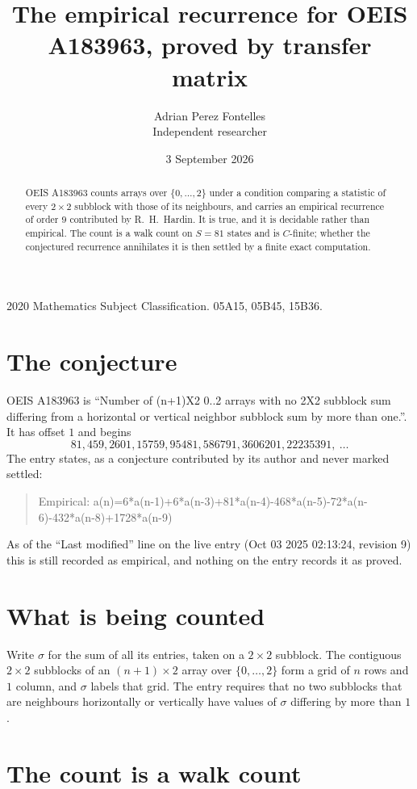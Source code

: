 \documentclass[11pt,a4paper]{article}
\title{The empirical recurrence for OEIS A183963, proved by transfer matrix}
\author{Adrian Perez Fontelles\\ \small Independent researcher}
\date{3 September 2026}
\theoremstyle{plain}
\theoremstyle{definition}
\begin{document}
\maketitle

\begin{abstract}
OEIS A183963 counts arrays over $\{0,\dots,2\}$ under a condition comparing a statistic of
every $2\times2$ subblock with those of its neighbours, and carries an empirical recurrence
of order $9$ contributed by R.~H.~Hardin. It is true, and it is decidable rather than
empirical. The count is a walk count on $S=81$ states and is $C$-finite; whether the
conjectured recurrence annihilates it is then settled by a finite exact computation.
\end{abstract}

\noindent\small 2020 Mathematics Subject Classification. 05A15, 05B45, 15B36.\normalsize

\section{The conjecture}

OEIS A183963 is ``Number of (n+1)X2 0..2 arrays with no 2X2 subblock sum differing from a horizontal or vertical neighbor subblock sum by more than one.''. It has offset $1$ and begins
\[
81, 459, 2601, 15759, 95481, 586791, 3606201, 22235391,\ \dots
\]
The entry states, as a conjecture contributed by its author and never marked settled:
\begin{quote}
Empirical: a(n)=6*a(n-1)+6*a(n-3)+81*a(n-4)-468*a(n-5)-72*a(n-6)-432*a(n-8)+1728*a(n-9)
\end{quote}
As of the ``Last modified'' line on the live entry (Oct 03 2025 02:13:24, revision 9) this is still
recorded as empirical, and nothing on the entry records it as proved.

\section{What is being counted}

Write $\sigma$ for the sum of all its entries, taken on a $2\times2$ subblock. The contiguous $2\times2$
subblocks of an $(n+1)\times2$ array over $\{0,\dots,2\}$ form a grid of $n$ rows
and $1$ column, and $\sigma$ labels that grid. The entry
requires that no two subblocks that are neighbours horizontally or vertically have values of $\sigma$ differing by more than $1$.

\section{The count is a walk count}
\end{document}
